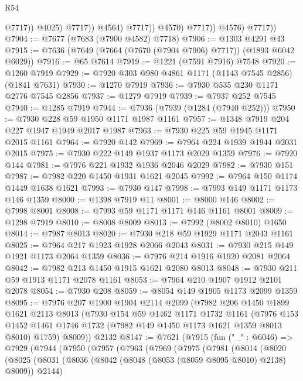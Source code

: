 \begin{lexlean}{R54}
\begin{coremodule}
                                @7717))
                            @4025)
                          @7717))
                      @4564)
                    @7717))
                @4570)
              @7717))
          @4576)
        @7717))
@7904 := @7677 (@7683 (@7900 @4582) @7718)
@7906 := @1303 @4291 @43
@7915 := @7636 (@7649 (@7664 (@7670 (@7904 @7906) @7717)) (@1893 @6042 @6029))
@7916 := @65 @7614
@7919 := @1221 (@7591 @7916) @7548
@7920 := @1260 @7919
@7929 := @7920 @303 @980 @4861 @1171 (@1143 @7545 @2856) (@1841 @7631)
@7930 := @1270 @7919
@7936 := @7930 @535 @230 @1171 @2776 @7545 @2856
@7937 := @1279 @7919
@7939 := @7937 @252 @7545
@7940 := @1285 @7919
@7944 := @7936 (@7939 (@1284 (@7940 @252)))
@7950 := @7930 @228 @59 @1950 @1171 @1987 @1161
@7957 := @1348 @7919 @204 @227 @1947 @1949 @2017 @1987
@7963 := @7930 @225 @59 @1945 @1171 @2015 @1161
@7964 := @7920 @142
@7969 := @7964 @224 @1939 @1944 @2031 @2015
@7975 := @7930 @222 @149 @1937 @1173 @2029 @1359
@7976 := @7920 @144
@7981 := @7976 @221 @1932 @1936 @2046 @2029
@7982 := @7930 @151
@7987 := @7982 @220 @1450 @1931 @1621 @2045
@7992 := @7964 @150 @1174 @1449 @1638 @1621
@7993 := @7930 @147
@7998 := @7993 @149 @1171 @1173 @146 @1359
@8000 := @1398 @7919 @11
@8001 := @8000 @146
@8002 := @7998 @8001
@8008 := @7993 @59 @1171 @1171 @146 @1161 @8001
@8009 := @1298 @7919
@8010 := @8008 @8009
@8013 := @7992 (@8002 @8010) @1650
@8014 := @7987 @8013
@8020 := @7930 @218 @59 @1929 @1171 @2043 @1161
@8025 := @7964 @217 @1923 @1928 @2066 @2043
@8031 := @7930 @215 @149 @1921 @1173 @2064 @1359
@8036 := @7976 @214 @1916 @1920 @2081 @2064
@8042 := @7982 @213 @1450 @1915 @1621 @2080 @8013
@8048 := @7930 @211 @59 @1913 @1171 @2078 @1161
@8053 := @7964 @210 @1907 @1912 @2101 @2078
@8054 := @7930 @208
@8059 := @8054 @149 @1905 @1173 @2099 @1359
@8095 := @7976
    @207
    @1900
    @1904
    @2114
    @2099
    (@7982
      @206
      @1450
      @1899
      @1621
      @2113
      @8013
      (@7930
        @154
        @59
        @1462
        @1171
        @1732
        @1161
        (@7976 @153 @1452 @1461 @1746 @1732 (@7982 @149 @1450 @1173 @1621 @1359 @8013 @8010) @1759)
        @8009))
    @2132
@8147 := @7621
    (@7915
      (fun ("_" : @6046) =>
      @7929
        (@7944
          (@7950
            (@7957
              (@7963
                (@7969
                  (@7975
                    (@7981
                      (@8014
                        (@8020
                          (@8025
                            (@8031
                              (@8036 (@8042 (@8048 (@8053 (@8059 @8095 @8010) @2138) @8009)) @2144)

\end{coremodule}
\end{lexlean}
